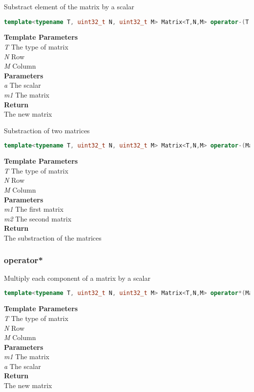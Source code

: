 \begin{mdframed}
Substract element of the matrix by a scalar
\begin{lstlisting}[language=C++]
template<typename T, uint32_t N, uint32_t M> Matrix<T,N,M> operator-(T a, Matrix<T,N,M> m1) 
\end{lstlisting}
\textbf{Template Parameters} \\ 
\textit{T} The type of matrix \\ 
\textit{N} Row \\ 
\textit{M} Column \\ 
\textbf{Parameters} \\ 
\textit{a} The scalar \\ 
\textit{m1} The matrix \\ 
\textbf{Return} \\ 
The new matrix\\ 
\end{mdframed}

\begin{mdframed}
Substraction of two matrices
\begin{lstlisting}[language=C++]
template<typename T, uint32_t N, uint32_t M> Matrix<T,N,M> operator-(Matrix<T,N,M> m1, const Matrix<T,N,M>& m2) 
\end{lstlisting}
\textbf{Template Parameters} \\ 
\textit{T} The type of matrix \\ 
\textit{N} Row \\ 
\textit{M} Column \\ 
\textbf{Parameters} \\ 
\textit{m1} The first matrix \\ 
\textit{m2} The second matrix \\ 
\textbf{Return} \\ 
The substraction of the matrices\\ 
\end{mdframed}

\subsubsection{operator*}
\begin{mdframed}
Multiply each component of a matrix by a scalar
\begin{lstlisting}[language=C++]
template<typename T, uint32_t N, uint32_t M> Matrix<T,N,M> operator*(Matrix<T,N,M> m1, T a) 
\end{lstlisting}
\textbf{Template Parameters} \\ 
\textit{T} The type of matrix \\ 
\textit{N} Row \\ 
\textit{M} Column \\ 
\textbf{Parameters} \\ 
\textit{m1} The matrix \\ 
\textit{a} The scalar \\ 
\textbf{Return} \\ 
The new matrix\\ 
\end{mdframed}

